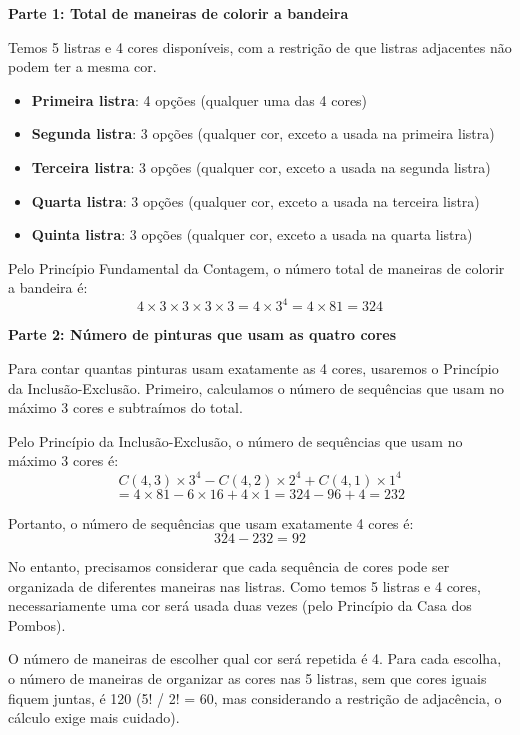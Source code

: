 \documentclass[12pt,a4paper]{article}
\begin{document}
    \vspace{0.5cm}
    
    \textbf{Parte 1: Total de maneiras de colorir a bandeira}
    
    Temos 5 listras e 4 cores disponíveis, com a restrição de que listras adjacentes não podem ter a mesma cor.
    
    \begin{itemize}
        \item \textbf{Primeira listra}: 4 opções (qualquer uma das 4 cores)
        \item \textbf{Segunda listra}: 3 opções (qualquer cor, exceto a usada na primeira listra)
        \item \textbf{Terceira listra}: 3 opções (qualquer cor, exceto a usada na segunda listra)
        \item \textbf{Quarta listra}: 3 opções (qualquer cor, exceto a usada na terceira listra)
        \item \textbf{Quinta listra}: 3 opções (qualquer cor, exceto a usada na quarta listra)
    \end{itemize}
    
    Pelo Princípio Fundamental da Contagem, o número total de maneiras de colorir a bandeira é:
    \[
    4 \times 3 \times 3 \times 3 \times 3 = 4 \times 3^4 = 4 \times 81 = 324
    \]
    
    \textbf{Parte 2: Número de pinturas que usam as quatro cores}
    
    Para contar quantas pinturas usam exatamente as 4 cores, usaremos o Princípio da Inclusão-Exclusão. Primeiro, calculamos o número de sequências que usam no máximo 3 cores e subtraímos do total.
    
    Pelo Princípio da Inclusão-Exclusão, o número de sequências que usam no máximo 3 cores é:
    \[
    C(4,3) \times 3^4 - C(4,2) \times 2^4 + C(4,1) \times 1^4
    \]
    \[
    = 4 \times 81 - 6 \times 16 + 4 \times 1 = 324 - 96 + 4 = 232
    \]
    
    Portanto, o número de sequências que usam exatamente 4 cores é:
    \[
    324 - 232 = 92
    \]
    
    No entanto, precisamos considerar que cada sequência de cores pode ser organizada de diferentes maneiras nas listras. Como temos 5 listras e 4 cores, necessariamente uma cor será usada duas vezes (pelo Princípio da Casa dos Pombos).
    
    O número de maneiras de escolher qual cor será repetida é 4. Para cada escolha, o número de maneiras de organizar as cores nas 5 listras, sem que cores iguais fiquem juntas, é 120 (5! / 2! = 60, mas considerando a restrição de adjacência, o cálculo exige mais cuidado).
    
\end{document}
